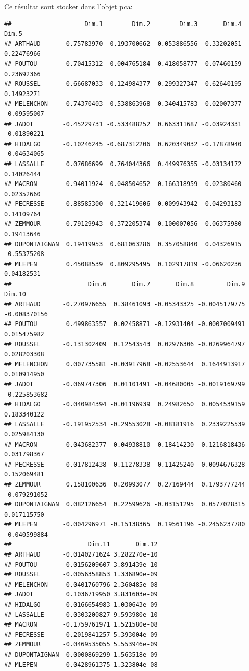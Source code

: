 \documentclass[
]{book}
\newenvironment{Shaded}{\begin{snugshade}}{\end{snugshade}}
\newcommand{\NormalTok}[1]{#1}
\newcommand{\SpecialCharTok}[1]{\textcolor[rgb]{0.81,0.36,0.00}{\textbf{#1}}}
\begin{document}
Ce résultat sont stocker dans l'objet pca:

\begin{Shaded}
\end{Shaded}

\begin{verbatim}
##                    Dim.1        Dim.2        Dim.3       Dim.4       Dim.5
## ARTHAUD       0.75783970  0.193700662  0.053886556 -0.33202051  0.22476966
## POUTOU        0.70415312  0.004765184  0.418058777 -0.07460159  0.23692366
## ROUSSEL       0.66687033 -0.124984377  0.299327347  0.62640195  0.14923271
## MELENCHON     0.74370403 -0.538863968 -0.340415783 -0.02007377 -0.09595007
## JADOT        -0.45229731 -0.533488252  0.663311687 -0.03924331 -0.01890221
## HIDALGO      -0.10246245 -0.687312206  0.620349032 -0.17878940 -0.04634065
## LASSALLE      0.07686699  0.764044366  0.449976355 -0.03134172  0.14026444
## MACRON       -0.94011924 -0.048504652  0.166318959  0.02380460  0.02352660
## PECRESSE     -0.88585300  0.321419606 -0.009943942  0.04293183  0.14109764
## ZEMMOUR      -0.79129943  0.372205374 -0.100007056  0.06375980  0.19413646
## DUPONTAIGNAN  0.19419953  0.681063286  0.357058840  0.04326915 -0.55375208
## MLEPEN        0.45088539  0.809295495  0.102917819 -0.06620236  0.04182531
##                     Dim.6       Dim.7       Dim.8         Dim.9       Dim.10
## ARTHAUD      -0.270976655  0.38461093 -0.05343325 -0.0045179775 -0.008370156
## POUTOU        0.499863557  0.02458871 -0.12931404 -0.0007009491  0.015475982
## ROUSSEL      -0.131302409  0.12543543  0.02976306 -0.0269964797  0.028203308
## MELENCHON     0.007735581 -0.03917968 -0.02553644  0.1644913917  0.010914950
## JADOT        -0.069747306  0.01101491 -0.04680005 -0.0019169799 -0.225853682
## HIDALGO      -0.040984394 -0.01196939  0.24982650  0.0054539159  0.183340122
## LASSALLE     -0.191952534 -0.29553028 -0.08181916  0.2339225539  0.025984130
## MACRON       -0.043682377  0.04938810 -0.18414230 -0.1216818436  0.031798367
## PECRESSE      0.017812438  0.11278338 -0.11425240 -0.0094676328  0.152069481
## ZEMMOUR       0.158100636  0.20993077  0.27169444  0.1793777244 -0.079291052
## DUPONTAIGNAN  0.082126654  0.22599626 -0.03151295  0.0577028315  0.017115750
## MLEPEN       -0.004296971 -0.15138365  0.19561196 -0.2456237780 -0.040599884
##                     Dim.11       Dim.12
## ARTHAUD      -0.0140271624 3.282270e-10
## POUTOU       -0.0156209607 3.891439e-10
## ROUSSEL      -0.0056358853 1.336890e-09
## MELENCHON     0.0401760796 2.360485e-08
## JADOT         0.1036719950 3.831603e-09
## HIDALGO      -0.0166654983 1.030643e-09
## LASSALLE     -0.0303200827 9.593980e-10
## MACRON       -0.1759761971 1.521580e-08
## PECRESSE      0.2019841257 5.393004e-09
## ZEMMOUR      -0.0469535055 5.553946e-09
## DUPONTAIGNAN  0.0000869299 1.563518e-09
## MLEPEN        0.0428961375 1.323804e-08
\end{verbatim}
\end{document}
